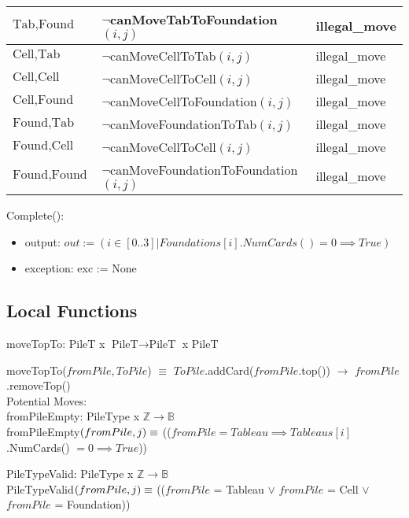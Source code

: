 \documentclass[12pt]{article}
\begin{document}
\begin{itemize}
\begin{tabular}{|l|l|l|}
\hline
$\mbox{Tab}, \mbox{Found}$ & $\lnot$canMoveTabToFoundation$(i, j)$& illegal\_move\\
\hline
$\mbox{Cell}, \mbox{Tab}$ & $\lnot$canMoveCellToTab$(i, j)$& illegal\_move\\
\hline
$\mbox{Cell}, \mbox{Cell}$ & $\lnot$canMoveCellToCell$(i, j)$& illegal\_move\\
\hline
$\mbox{Cell}, \mbox{Found}$ & $\lnot$canMoveCellToFoundation$(i, j)$& illegal\_move\\
\hline
$\mbox{Found}, \mbox{Tab}$ & $\lnot$canMoveFoundationToTab$(i, j)$& illegal\_move\\
\hline
$\mbox{Found}, \mbox{Cell}$ & $\lnot$canMoveCellToCell$(i, j)$& illegal\_move\\
\hline
$\mbox{Found}, \mbox{Found}$ & $\lnot$canMoveFoundationToFoundation$(i, j)$& illegal\_move\\
\hline
\end{tabular}
\end{itemize}


\noindent Complete():
\begin{itemize}
\item output: $out := (i \in [0..3]|Foundations[i].NumCards() = 0 \implies True)$
\item exception: exc := None
\end{itemize}

\subsection*{Local Functions}

moveTopTo: $\mbox{PileT} $ x $ \mbox{PileT} \rightarrow \mbox{PileT} $ x $ \mbox{PileT}$

\noindent moveTopTo($fromPile, ToPile$) $\equiv$ $ToPile$.addCard($fromPile$.top()) $\rightarrow$ $fromPile$.removeTop()\\


Potential Moves:\\
\noindent fromPileEmpty: PileType x $\mathbb{Z}$$\rightarrow \mathbb{B}$\\
fromPileEmpty$(fromPile, j)\\
\equiv$ (($fromPile = Tableau \implies Tableaus[i]$.NumCards() $= 0 \implies True$))

\bigskip
\noindent PileTypeValid: PileType x $\mathbb{Z}$$\rightarrow \mathbb{B}$\\
PileTypeValid$(fromPile, j)\\
\equiv$ (($fromPile$ = Tableau $\lor$ $fromPile$ = Cell $\lor$ $fromPile$ = Foundation))
\end{document}
